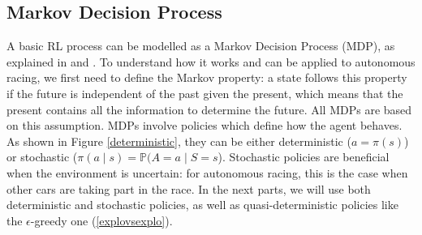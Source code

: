 \subsection{Markov Decision Process}
A basic RL process can be modelled as a Markov Decision Process (MDP), as explained in \cite{silver2015} and \cite{mdpinai}. To understand how it works and can be applied to autonomous racing, we first need to define the Markov property: a state follows this property if the future is independent of the past given the present, which means that the present contains all the information to determine the future. All MDPs are based on this assumption. MDPs involve policies which define how the agent behaves. As shown in Figure \ref{deterministic}, they can be either deterministic ($a = \pi(s)$) or stochastic ($\pi(a \mid s) = \mathbb{P}(A=a \mid S=s$). Stochastic policies are beneficial when the environment is uncertain: for autonomous racing, this is the case when other cars are taking part in the race. In the next parts, we will use both deterministic and stochastic policies, as well as quasi-deterministic policies like the $\epsilon$-greedy one (\ref{explovsexplo}).
